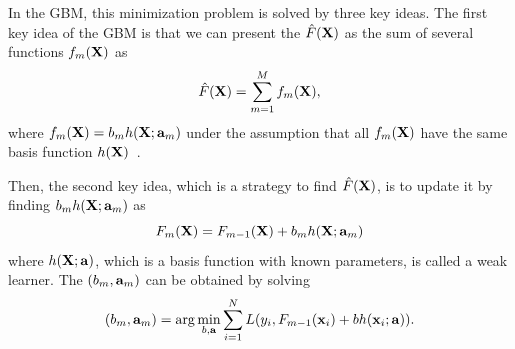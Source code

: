 \documentclass[journal]{IEEEtran} %
\begin{document}
In the GBM, this minimization problem is solved by three key ideas.
The first key idea of the GBM is that we can present the $\hat{F}(\bf{X})$ as the sum of several functions $f_m({\bf{X}})$ as 
\begin{equation}
\label{SubFunctions}
\hat F({\bf{X}}) = \sum\limits_{m = 1}^M {f_m({\bf{X}})}, 
\end{equation}
where $f_m({\bf{X}})= b_m h({\bf{X}}; {\bf{a}}_m)$ under the assumption that all $f_m({\bf{X}})$ have the same basis function $h({\bf{X}})$~\cite{Tibshirani}.


Then, the second key idea, which is a strategy to find $\hat F({\bf{X}})$, is to update it by finding $b_m h({\bf{X}}; {\bf{a}}_m)$ as
\begin{equation}
\label{Update}
{F_m}({\bf{X}}) = {F_{m - 1}}({\bf{X}}) + {b_m}h({\bf{X}};{{\bf{a}}_m})
\end{equation}
where $h({\bf{X}};{{\bf{a}}})$, which is a basis function with known parameters, is called a weak learner.
The $(b_m,{\bf{a}}_m)$ can be obtained by solving
\begin{equation}
\label{Parametric}
({b_m},{{\bf{a}}_m}) = \arg \mathop {\min }\limits_{b,{\bf{a}}} \sum\limits_{i = 1}^N {L({y_i},{F_{m - 1}}({{\bf{x}}_i}) + bh({{\bf{x}}_i};{\bf{a}}))}.
\end{equation}
\end{document}
